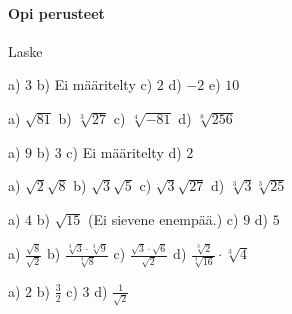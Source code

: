 \begin{tehtavasivu}

\paragraph*{Opi perusteet}

Laske
\begin{tehtava}

\begin{vastaus}
\end{vastaus}
\end{tehtava}

\begin{tehtava}

\begin{vastaus}
a) $3$ b) Ei määritelty c) $2$ d) $-2$  e) $10$
\end{vastaus}
\end{tehtava}

\begin{tehtava}
a) $\sqrt{81}$ \quad b) $\sqrt[3]{27}$ \quad c) $\sqrt[4]{-81}$ \quad d) $\sqrt[8]{256}$ 

\begin{vastaus}
a) $9$ b) $3$ c) Ei määritelty d) $2$
\end{vastaus}
\end{tehtava}

\begin{tehtava} %
a) $\sqrt{2}\sqrt{8}$  \quad b)  $\sqrt{3}\sqrt{5}$ \quad c)  $\sqrt{3}\sqrt{27}$ \quad  d) $\sqrt[3]{3}\sqrt[3]{25} $
\begin{vastaus}
a) $4$ \quad b) $\sqrt{15}$ (Ei sievene enempää.)  \quad c) $9$ \quad d) $5$
\end{vastaus}
\end{tehtava}


\begin{tehtava} 
a) $ \frac{\sqrt{8}}{\sqrt{2}}$  \quad b)   $ \frac{\sqrt[3]{3} \cdot \sqrt[3]{9}}{\sqrt[3]{8}}$   \quad c)  $ \frac{\sqrt{3} \cdot \sqrt{6}}{\sqrt{2}}$ \quad d) $ \frac {\sqrt[3]{2}}{\sqrt[3]{16}} \cdot \sqrt[3]{4}$ 
\begin{vastaus}
a) $2$ \quad b) $\frac{3}{2}$  \quad c) $3$ \quad d) $\frac{1}{\sqrt{2}}$
\end{vastaus}
\end{tehtava}



\end{tehtavasivu}

